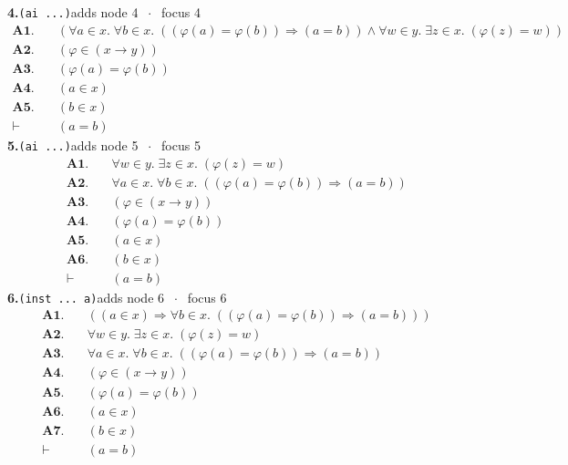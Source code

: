 \documentclass[11pt]{article}
\begin{document}
\medskip\noindent\textbf{4.}\quad \texttt{(ai ...)}\hfill{\small adds node 4 $\;\cdot\;$ focus 4}\\[2pt]
\begin{align*}
  \mathbf{A1.}\quad & (\forall a \in x.\; \forall b \in x.\; ((\varphi(a) = \varphi(b)) \Rightarrow (a = b)) \wedge \forall w \in y.\; \exists z \in x.\; (\varphi(z) = w)) \\
  \mathbf{A2.}\quad & (\varphi \in (x \to y)) \\
  \mathbf{A3.}\quad & (\varphi(a) = \varphi(b)) \\
  \mathbf{A4.}\quad & (a \in x) \\
  \mathbf{A5.}\quad & (b \in x) \\
  \vdash\quad & (a = b)
\end{align*}
\medskip\noindent\textbf{5.}\quad \texttt{(ai ...)}\hfill{\small adds node 5 $\;\cdot\;$ focus 5}\\[2pt]
\begin{align*}
  \mathbf{A1.}\quad & \forall w \in y.\; \exists z \in x.\; (\varphi(z) = w) \\
  \mathbf{A2.}\quad & \forall a \in x.\; \forall b \in x.\; ((\varphi(a) = \varphi(b)) \Rightarrow (a = b)) \\
  \mathbf{A3.}\quad & (\varphi \in (x \to y)) \\
  \mathbf{A4.}\quad & (\varphi(a) = \varphi(b)) \\
  \mathbf{A5.}\quad & (a \in x) \\
  \mathbf{A6.}\quad & (b \in x) \\
  \vdash\quad & (a = b)
\end{align*}
\medskip\noindent\textbf{6.}\quad \texttt{(inst ... a)}\hfill{\small adds node 6 $\;\cdot\;$ focus 6}\\[2pt]
\begin{align*}
  \mathbf{A1.}\quad & ((a \in x) \Rightarrow \forall b \in x.\; ((\varphi(a) = \varphi(b)) \Rightarrow (a = b))) \\
  \mathbf{A2.}\quad & \forall w \in y.\; \exists z \in x.\; (\varphi(z) = w) \\
  \mathbf{A3.}\quad & \forall a \in x.\; \forall b \in x.\; ((\varphi(a) = \varphi(b)) \Rightarrow (a = b)) \\
  \mathbf{A4.}\quad & (\varphi \in (x \to y)) \\
  \mathbf{A5.}\quad & (\varphi(a) = \varphi(b)) \\
  \mathbf{A6.}\quad & (a \in x) \\
  \mathbf{A7.}\quad & (b \in x) \\
  \vdash\quad & (a = b)
\end{align*}
\end{document}
